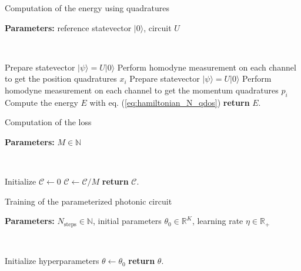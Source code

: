 \documentclass[reprint, amsmath, amssymb, aps]{revtex4-2}
\begin{document}
    \begin{algorithm}
        \caption{Computation of the energy using quadratures}
        \label{alg:energy_computation_quadratures}
            \textbf{Parameters:} reference statevector $|0\rangle$, circuit $U$

            \

            Prepare statevector $|\psi\rangle = U|0\rangle$\;
            Perform homodyne measurement on each channel to get the position quadratures $x_i$\;
            Prepare statevector $|\psi\rangle = U|0\rangle$\;
            Perform homodyne measurement on each channel to get the momentum quadratures $p_i$\;
            Compute the energy $E$ with eq. (\ref{eq:hamiltonian_N_qdos})\;
            \textbf{return} $E$.
    \end{algorithm}

    \begin{algorithm}
        \caption{Computation of the loss}\label{alg:loss_computation}
            \textbf{Parameters:} $M\in\mathbb N$

            \

            Initialize $\mathcal C \gets 0$\;
                $\mathcal C \gets \mathcal C / M$\;
            \textbf{return} $\mathcal C$.
    \end{algorithm}

    \begin{algorithm}
        \caption{Training of the parameterized photonic circuit}\label{alg:training}
        \textbf{Parameters:} $N_\text{steps}\in\mathbb N$, initial parameters $\theta_0\in\mathbb R^K$, learning rate $\eta\in\mathbb R_+$

        \

        Initialize hyperparameters $\theta \gets \theta_0$\;
        \textbf{return} $\theta$.
    \end{algorithm}
\end{document}
